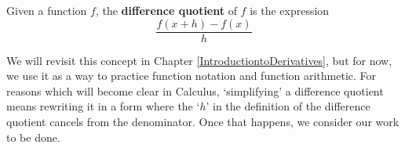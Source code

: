 \documentclass{ximera}
\begin{document}
	\author{Stitz-Zeager}
    


\begin{definition}\label{differencequotient}

Given a function $f$, the \textbf{difference quotient} of $f$ is the expression \[ \frac{f(x+h) - f(x)}{h} \]

\end{definition}


We will revisit this concept in Chapter \ref{IntroductiontoDerivatives}, but for now, we use it as a way to practice function notation and function arithmetic.  For reasons which will become clear in Calculus,  `simplifying' a difference quotient means rewriting it in a form where the `$h$' in the definition of the difference quotient cancels from the denominator. Once that happens, we consider our work to be done.
\end{document}
